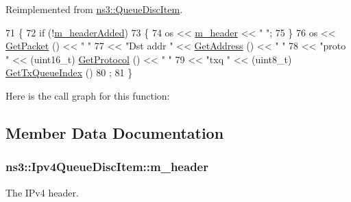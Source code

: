 Reimplemented from \hyperlink{classns3_1_1QueueDiscItem_ade009bbe42f262c76d68a8530e207762}{ns3\+::\+Queue\+Disc\+Item}.


\begin{DoxyCode}
71 \{
72   \textcolor{keywordflow}{if} (!\hyperlink{classns3_1_1Ipv4QueueDiscItem_a04c1067a2893d8b5b6cf2c98d083d0c7}{m\_headerAdded})
73     \{
74       os << \hyperlink{classns3_1_1Ipv4QueueDiscItem_a26c48ea7da60a1a7c21d00c5171ed570}{m\_header} << \textcolor{stringliteral}{" "};
75     \}
76   os << \hyperlink{classns3_1_1QueueItem_aa8c2a59b1600fa2cee783867704f9cce}{GetPacket} () << \textcolor{stringliteral}{" "}
77      << \textcolor{stringliteral}{"Dst addr "} << \hyperlink{classns3_1_1QueueDiscItem_ac13b6adb92790c4e850698a3a11fd448}{GetAddress} () << \textcolor{stringliteral}{" "}
78      << \textcolor{stringliteral}{"proto "} << (uint16\_t) \hyperlink{classns3_1_1QueueDiscItem_aa1538ff5222ab86652d21d005ad839a4}{GetProtocol} () << \textcolor{stringliteral}{" "}
79      << \textcolor{stringliteral}{"txq "} << (uint8\_t) \hyperlink{classns3_1_1QueueDiscItem_ac0f4a13528a69cb352cb7549fe3eb574}{GetTxQueueIndex} ()
80   ;
81 \}
\end{DoxyCode}


Here is the call graph for this function\+:




\subsection{Member Data Documentation}
\subsubsection[{\texorpdfstring{m\+\_\+header}{m_header}}]{ ns3\+::\+Ipv4\+Queue\+Disc\+Item\+::m\+\_\+header\hspace{0.3cm}{\ttfamily [private]}}\hypertarget{classns3_1_1Ipv4QueueDiscItem_a26c48ea7da60a1a7c21d00c5171ed570}{}\label{classns3_1_1Ipv4QueueDiscItem_a26c48ea7da60a1a7c21d00c5171ed570}


The I\+Pv4 header. 

